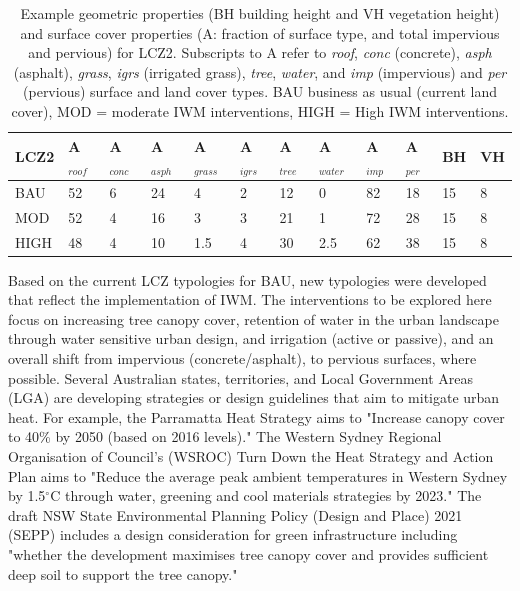 \documentclass[utf8]{frontiersSCNS} %
\begin{document}
\setlength\arrayrulewidth{1pt} %
\begin{table}[!ht]
\caption{Example geometric properties (BH building height and VH vegetation height) and surface cover properties (A: fraction of surface type, and total impervious and pervious) for LCZ2. Subscripts to A refer to \textit{roof}, \textit{conc} (concrete), \textit{asph} (asphalt), \textit{grass}, \textit{igrs} (irrigated grass), \textit{tree}, \textit{water}, and \textit{imp} (impervious) and \textit{per} (pervious) surface and land cover types. BAU business as usual (current land cover), MOD = moderate IWM interventions, HIGH = High IWM interventions.}
    \centering
    \begin{tabular}{|l|l|l|l|l|l|l|l|l|l|l|l|}
    \hline
       \rowcolor{light-gray} LCZ2  & A$_{roof}$  & A$_{conc}$  & A$_{asph}$  & A$_{grass}$  & A$_{igrs}$  & A$_{tree}$  & A$_{water}$  & A$_{imp}$  & A$_{per}$  & BH  & VH  \\ \hline
        BAU & 52 & 6 & 24 & 4 & 2 & 12 & 0 & 82 & 18 & 15 & 8 \\ \hline
        MOD & 52 & 4 & 16 & 3 & 3 & 21 & 1 & 72 & 28 & 15 & 8 \\ \hline
        HIGH & 48 & 4 & 10 & 1.5 & 4 & 30 & 2.5 & 62 & 38 & 15 & 8 \\ \hline
    \end{tabular}\label{table:lcz2}
\end{table}
\setlength\arrayrulewidth{0.4pt} %

Based on the current LCZ typologies for BAU, new typologies were developed that reflect the implementation of IWM. The interventions to be explored here focus on increasing tree canopy cover, retention of water in the urban landscape through water sensitive urban design, and irrigation (active or passive), and an overall shift from impervious (concrete/asphalt), to pervious surfaces, where possible. Several Australian states, territories, and Local Government Areas (LGA) are developing strategies or design guidelines that aim to mitigate urban heat. For example, the Parramatta Heat Strategy \citep{Paramatta2021} aims to "Increase canopy cover to 40\% by 2050 (based on 2016 levels)." The Western Sydney Regional Organisation of Council's (WSROC) \citep{WSROC2021} Turn Down the Heat Strategy and Action Plan aims to "Reduce the average peak ambient temperatures in Western Sydney by 1.5$^{\circ}$C through water, greening and cool materials strategies by 2023." The draft NSW State Environmental Planning Policy (Design and Place) 2021 (SEPP) \citep{NewSouthWales2021} includes a design consideration for green infrastructure including "whether the development maximises tree canopy cover and provides sufficient deep soil to support the tree canopy."
\end{document}
